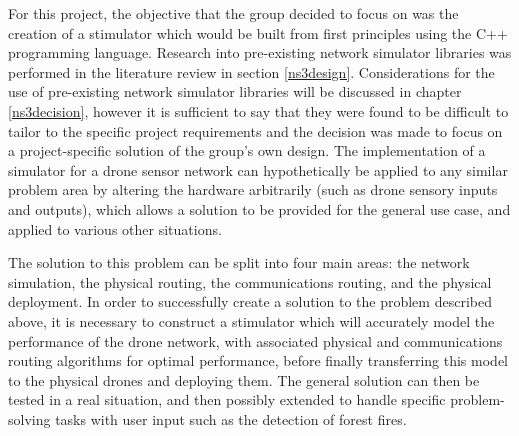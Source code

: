 For this project, the objective that the group decided to focus on was the creation of a stimulator which would be built from first principles using the C++ programming language. Research into pre-existing network simulator libraries was performed in the literature review in section \ref{ns3design}. Considerations for the use of pre-existing network simulator libraries will be discussed in chapter \ref{ns3decision}, however it is sufficient to say that they were found to be difficult to tailor to the specific project requirements and the decision was made to focus on a project-specific solution of the group’s own design. The implementation of a simulator for a drone sensor network can hypothetically be applied to any similar problem area by altering the hardware arbitrarily (such as drone sensory inputs and outputs), which allows a solution to be provided for the general use case, and applied to various other situations.

The solution to this problem can be split into four main areas: the network simulation, the physical routing, the communications routing, and the physical deployment. In order to successfully create a solution to the problem described above, it is necessary to construct a stimulator which will accurately model the performance of the drone network, with associated physical and communications routing algorithms for optimal performance, before finally transferring this model to the physical drones and deploying them. The general solution can then be tested in a real situation, and then possibly extended to handle specific problem-solving tasks with user input such as the detection of forest fires. 
